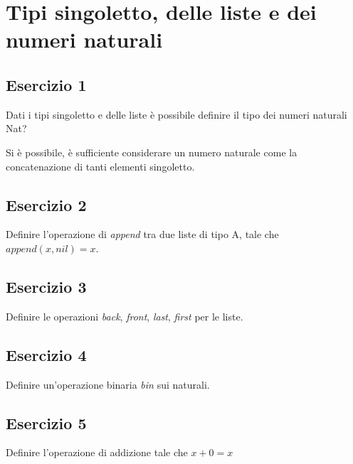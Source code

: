 \newpage
\setcounter{section}{2}
\section{Tipi singoletto, delle liste e dei numeri naturali}
\subsection{Esercizio 1}
\begin{thm}
	Dati i tipi singoletto e delle liste è possibile definire il tipo dei numeri naturali Nat?
\end{thm}
Si è possibile, è sufficiente considerare un numero naturale come la concatenazione di tanti elementi singoletto. 

\subsection{Esercizio 2}
\begin{thm}
	Definire l'operazione di \textit{append} tra due liste di tipo A, tale che $append(x, nil) = x$.
\end{thm}


\subsection{Esercizio 3}
\begin{thm}
	Definire le operazioni \textit{back}, \textit{front}, \textit{last}, \textit{first} per le liste.
\end{thm}


\subsection{Esercizio 4}
\begin{thm}
	Definire un'operazione binaria \textit{bin} sui naturali.
\end{thm}


\subsection{Esercizio 5}
\begin{thm}
	Definire l'operazione di addizione tale che $x + 0 = x$
\end{thm}


